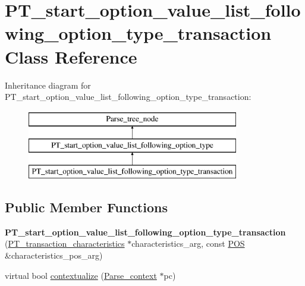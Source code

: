 \hypertarget{classPT__start__option__value__list__following__option__type__transaction}{}\section{P\+T\+\_\+start\+\_\+option\+\_\+value\+\_\+list\+\_\+following\+\_\+option\+\_\+type\+\_\+transaction Class Reference}
\label{classPT__start__option__value__list__following__option__type__transaction}
Inheritance diagram for P\+T\+\_\+start\+\_\+option\+\_\+value\+\_\+list\+\_\+following\+\_\+option\+\_\+type\+\_\+transaction\+:\begin{figure}[H]
\begin{center}
\leavevmode
\includegraphics[height=3.000000cm]{classPT__start__option__value__list__following__option__type__transaction}
\end{center}
\end{figure}
\subsection*{Public Member Functions}
\begin{DoxyCompactItemize}
\item 
\mbox{\label{classPT__start__option__value__list__following__option__type__transaction_a3d5aecfa910d96f3e1d0d3728350629d}} 
{\bfseries P\+T\+\_\+start\+\_\+option\+\_\+value\+\_\+list\+\_\+following\+\_\+option\+\_\+type\+\_\+transaction} (\mbox{\hyperlink{classPT__transaction__characteristics}{P\+T\+\_\+transaction\+\_\+characteristics}} $\ast$characteristics\+\_\+arg, const \mbox{\hyperlink{structYYLTYPE}{P\+OS}} \&characteristics\+\_\+pos\+\_\+arg)
\item 
virtual bool \mbox{\hyperlink{classPT__start__option__value__list__following__option__type__transaction_ac15edbbf907d20a95c589a0e1e016e2a}{contextualize}} (\mbox{\hyperlink{structParse__context}{Parse\+\_\+context}} $\ast$pc)
\end{DoxyCompactItemize}
